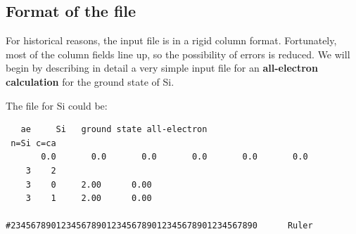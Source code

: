 \documentclass[11pt]{article}
\begin{document}
\subsection{Format of the file}
\label{sec:inputfile}

For historical reasons, the input file is in a rigid column
format. Fortunately, most of the column fields line up, so the
possibility of errors is reduced.  We will begin by describing in
detail a very simple input file for an {\bf all-electron calculation} for
the ground state of Si.

The file for Si could be:
\begin{verbatim}
   ae     Si   ground state all-electron
 n=Si c=ca
       0.0       0.0       0.0       0.0       0.0       0.0
    3    2
    3    0     2.00      0.00
    3    1     2.00      0.00

#2345678901234567890123456789012345678901234567890      Ruler
\end{verbatim}
\end{document}
